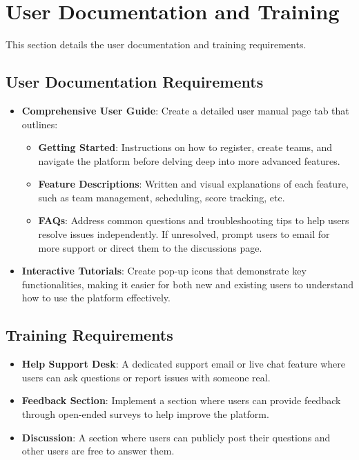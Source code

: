 \documentclass[12pt, titlepage]{article}
\begin{document}
\section{User Documentation and Training}
This section details the user documentation and training requirements.
\subsection{User Documentation Requirements}
\begin{itemize}
    \item \textbf{Comprehensive User Guide}: Create a detailed user manual page tab that outlines:
    \begin{itemize}
        \item \textbf{Getting Started}: Instructions on how to register, create teams, and navigate the platform before delving deep into more advanced features.
        \item \textbf{Feature Descriptions}: Written and visual explanations of each feature, such as team management, scheduling, score tracking, etc.
        \item \textbf{FAQs}: Address common questions and troubleshooting tips to help users resolve issues independently. If unresolved, prompt users to email for more support or direct them to the discussions page.
    \end{itemize}
    \item \textbf{Interactive Tutorials}: Create pop-up icons that demonstrate key functionalities, making it easier for both new and existing users to understand how to use the platform effectively.
\end{itemize}

\subsection{Training Requirements}
\begin{itemize}
    \item \textbf{Help Support Desk}: A dedicated support email or live chat feature where users can ask questions or report issues with someone real.
    \item \textbf{Feedback Section}: Implement a section where users can provide feedback through open-ended surveys to help improve the platform.
    \item \textbf{Discussion}: A section where users can publicly post their questions and other users are free to answer them.
\end{itemize}
\end{document}
